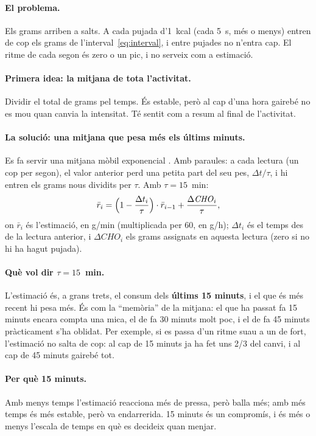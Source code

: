 \documentclass[10pt,a4paper]{article}
\newcommand{\cho}{\ensuremath{\mathit{CHO}}}               %
\begin{document}
\paragraph{El problema.} Els grams arriben a salts. A cada pujada d'1~kcal (cada 5~s,
més o menys) entren de cop els grams de l'interval~\eqref{eq:interval}, i entre pujades no
n'entra cap. El ritme de cada segon és zero o un pic, i no serveix com a estimació.

\paragraph{Primera idea: la mitjana de tota l'activitat.} Dividir el total de grams pel
temps. És estable, però al cap d'una hora gairebé no es mou quan canvia la intensitat. Té
sentit com a resum al final de l'activitat.

\paragraph{La solució: una mitjana que pesa més els últims minuts.} Es fa servir una
mitjana mòbil exponencial \citep{hunter1986}. Amb paraules: a cada lectura (un cop per
segon), el valor anterior perd una petita part del seu pes, $\Delta t/\tau$, i hi entren
els grams nous dividits per $\tau$. Amb $\tau=15$~min:
\begin{equation}
  \bar r_i=\Bigl(1-\frac{\Delta t_i}{\tau}\Bigr)\cdot\bar r_{i-1}+\frac{\Delta\cho_i}{\tau},
  \label{eq:ema}
\end{equation}
on $\bar r_i$ és l'estimació, en g/min (multiplicada per 60, en g/h); $\Delta t_i$ és el
temps des de la lectura anterior, i $\Delta\cho_i$ els grams assignats en aquesta lectura
(zero si no hi ha hagut pujada).

\paragraph{Què vol dir $\tau=15$~min.} L'estimació és, a grans trets, el consum dels
\textbf{últims 15 minuts}, i el que és més recent hi pesa més. És com la ``memòria'' de la
mitjana: el que ha passat fa 15 minuts encara compta una mica, el de fa 30 minuts molt poc, i
el de fa 45 minuts pràcticament s'ha oblidat. Per exemple, si es passa d'un ritme suau a un
de fort, l'estimació no salta de cop: al cap de 15 minuts ja ha fet uns 2/3 del canvi, i al
cap de 45 minuts gairebé tot.

\paragraph{Per què 15 minuts.} Amb menys temps l'estimació reacciona més de pressa, però
balla més; amb més temps és més estable, però va endarrerida. 15 minuts és un compromís, i
és més o menys l'escala de temps en què es decideix quan menjar.
\end{document}
